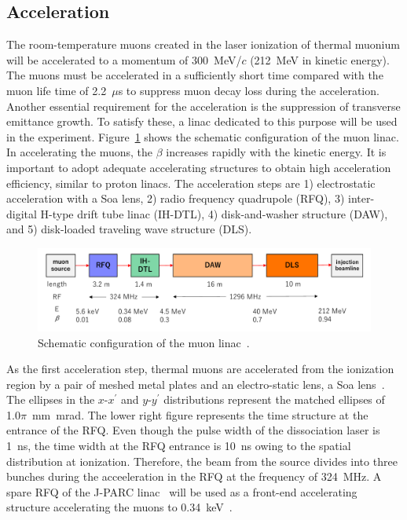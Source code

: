 \subsection{Acceleration}


The room-temperature muons created in the laser ionization of thermal muonium will be 
accelerated to a momentum of 300~MeV/$c$ (212~MeV in kinetic energy).
The muons must be accelerated in a sufficiently short time
compared with the muon life time of 2.2~$\mu$s
to suppress muon decay loss during the acceleration.
Another essential requirement for the acceleration is
the suppression of transverse emittance growth.
To satisfy these, a linac dedicated to this purpose will be used in the experiment.
Figure~\ref{fig:mulinac_config} shows the schematic configuration
of the muon linac.
In accelerating the muons, the $\beta$ increases rapidly with the
kinetic energy.
It is important to adopt adequate 
accelerating structures to obtain high acceleration efficiency,
similar to proton linacs. 
The acceleration steps are 1) electrostatic acceleration with a Soa lens,
2) radio frequency quadrupole (RFQ),
3) inter-digital H-type drift tube linac (IH-DTL),
4) disk-and-washer structure (DAW),
and 5) disk-loaded traveling wave structure (DLS).

\begin{figure}[t]
\centering
\includegraphics*[width=1.0\textwidth,bb=0 0 680 170]{Fig/muonlinac.pdf}
\caption{Schematic configuration of the muon linac~\cite{TDRsummarypaper}.}
\label{fig:mulinac_config}
\end{figure}


 As the first acceleration step, thermal muons are accelerated from the ionization region
by a pair of meshed metal plates and an electro-static lens, a Soa lens~\cite{Soa}.
The ellipses in the $x$-$x^{\prime}$ and $y$-$y^{\prime}$ distributions represent
the matched ellipses of 1.0$\pi$~mm~mrad.
The lower right figure represents the time structure at the entrance
of the RFQ.
Even though the pulse width of the dissociation laser is 1~ns,
the time width at the RFQ entrance is 10~ns
owing to the spatial distribution at ionization.
Therefore, the beam from the source divides into three bunches during 
the acceeleration in the RFQ at the frequency of 324~MHz.
A spare RFQ of the J-PARC linac~\cite{kondo:hptest_rfqII:prstab2013}
will be used as a front-end accelerating
structure accelerating the muons to 0.34~keV~\cite{kondo:simulation_mu_rfq:ipac2015}.

